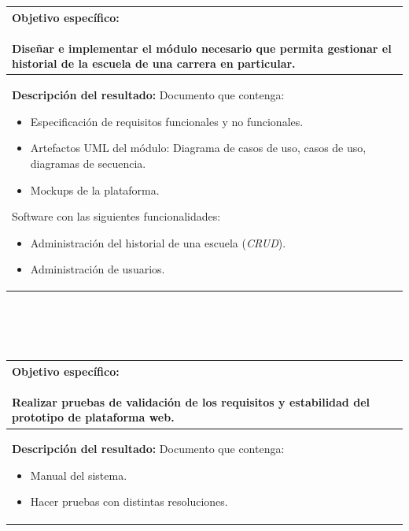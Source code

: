 \documentclass[12pt]{article}
\begin{document}
			 			\begin{tabular}{ |p{15cm}|} \hline
				 \parbox[c]{15cm}{ {\bf Objetivo específico:}\\ \\ Diseñar e implementar el módulo necesario que 
				 permita gestionar el historial de la escuela de una carrera en particular.\\} 
			\\
			 \hline
				 \parbox[c]{15cm}{ {\bf Descripción del resultado:}\\ 
				Documento que contenga: \\
				 \begin{itemize}
					 \item 	Especificación de requisitos funcionales y no funcionales.
				  \item Artefactos UML del módulo: Diagrama de casos de uso, casos de uso, diagramas de secuencia.
				  \item Mockups de la plataforma.
				
				 \end{itemize}
			Software con las siguientes funcionalidades:\\
			      \begin{itemize}
				\item Administración del historial de una escuela (\textit{CRUD}).
			       \item Administración de usuarios.
			       \
			     
			      \end{itemize}

				 
					} 
			 \\ \hline			 
			 \end{tabular}	
			 \\ \\  \\ 
			 
			\begin{tabular}{ |p{15cm}|} \hline
				 \parbox[c]{15cm}{ {\bf Objetivo específico:}\\ \\  Realizar pruebas de validación de los requisitos y estabilidad del prototipo de
plataforma web.\\} 
			\\
			 \hline
				 \parbox[c]{15cm}{ {\bf Descripción del resultado:}\\ 
				Documento que contenga: \\
				 \begin{itemize}
				  \item Manual del sistema.
				  \item Hacer pruebas con distintas resoluciones.
				
				 \end{itemize}
		

				 
					} 
			 \\ \hline			 
			 \end{tabular}	
			 \\ \\  \\ 
			 
\end{document}
